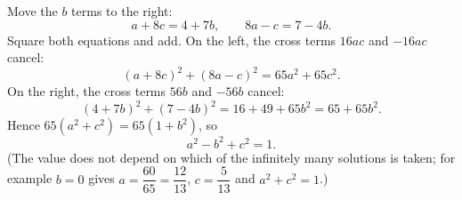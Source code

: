 Move the $b$ terms to the right:
\[
a+8c=4+7b,\qquad 8a-c=7-4b .
\]
Square both equations and add. On the left, the cross terms $16ac$ and $-16ac$ cancel:
\[
(a+8c)^2+(8a-c)^2=65a^2+65c^2 .
\]
On the right, the cross terms $56b$ and $-56b$ cancel:
\[
(4+7b)^2+(7-4b)^2=16+49+65b^2=65+65b^2 .
\]
Hence $65(a^2+c^2)=65(1+b^2)$, so
\[
a^2-b^2+c^2=\boxed{1}.
\]
(The value does not depend on which of the infinitely many solutions is taken; for example $b=0$ gives $a=\dfrac{60}{65}=\dfrac{12}{13}$, $c=\dfrac{5}{13}$ and $a^2+c^2=1$.)
